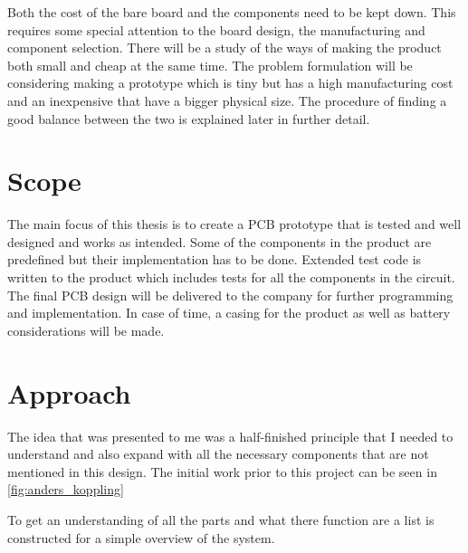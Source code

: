 Both the cost of the bare board and the components need to be kept down.  This requires some special attention to the board design, the manufacturing and component selection.
There will be a study of the ways of making the product both small and cheap at the same time. The problem formulation will be considering making a prototype which is tiny but has a high manufacturing cost and an inexpensive that have a bigger physical size. The procedure of finding a good balance between the two is explained later in further detail.

\section{Scope}
The main focus of this thesis is to create a PCB prototype that is tested and well designed and works as intended. Some of the components in the product are predefined but their implementation has to be done.
Extended test code is written to the product which includes tests for all the components in the circuit.  
The final PCB design will be delivered to the company for further programming and implementation.
In case of time, a casing for the product as well as battery considerations will be made.

\newpage
\section{Approach}
The idea that was presented to me was a half-finished principle that I needed to understand and also expand with all the necessary components that are not mentioned in this design. The initial work prior to this project can be seen in \autoref{fig:anders_koppling}


To get an understanding of all the parts and what there function are a list is constructed for a simple overview of the system.

